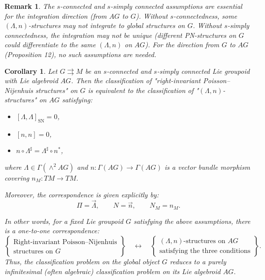 \documentclass{article}
\newcommand{\SN}{\mathrm{SN}}
\newcommand{\LL}{\Lambda}
\newtheorem{corollary}[theorem]{Corollary}
\newtheorem{remark}[theorem]{Remark}
\begin{document}
\begin{remark}
The $s$-connected and $s$-simply connected assumptions are essential for the integration direction (from $AG$ to $G$). Without $s$-connectedness, some $(\LL, n)$-structures may not integrate to global structures on $G$. Without $s$-simply connectedness, the integration may not be unique (different PN-structures on $G$ could differentiate to the same $(\LL, n)$ on $AG$). For the direction from $G$ to $AG$ (Proposition 12), no such assumptions are needed.
\end{remark}


\vspace{0.5cm}

\begin{corollary}
\label{cor:classification}
Let $G \rightrightarrows M$ be an $s$-connected and $s$-simply connected Lie groupoid with Lie algebroid $AG$. Then the classification of "right-invariant Poisson–Nijenhuis structures" on $G$ is equivalent to the classification of "$(\Lambda, n)$-structures" on $AG$ satisfying:
\begin{itemize}
    \item $[\Lambda, \Lambda]_{\SN} = 0$,
    \item $[n, n] = 0$,
    \item $n \circ \Lambda^{\sharp} = \Lambda^{\sharp} \circ n^{*}$,
\end{itemize}
where $\Lambda \in \Gamma(\wedge^2 AG)$ and $n: \Gamma{(AG)} \to \Gamma{(AG)}$ is a vector bundle morphism covering $n_M: TM \to TM$.

Moreover, the correspondence is given explicitly by:
\[
\Pi = \overrightarrow{\Lambda}, \qquad N = \overrightarrow{n}, \qquad N_M = n_M.
\]

In other words, for a fixed Lie groupoid $G$ satisfying the above assumptions, there is a one-to-one correspondence:
\[
\left\{
\begin{array}{c}
\text{Right-invariant Poisson--Nijenhuis} \\
\text{structures on } G
\end{array}
\right\}
\quad \longleftrightarrow \quad
\left\{
\begin{array}{c}
(\Lambda, n)\text{-structures on } AG \\
\text{satisfying the three conditions}
\end{array}
\right\}.
\]
Thus, the classification problem on the global object $G$ reduces to a purely infinitesimal (often algebraic) classification problem on its Lie algebroid $AG$.
\end{corollary}
\end{document}
